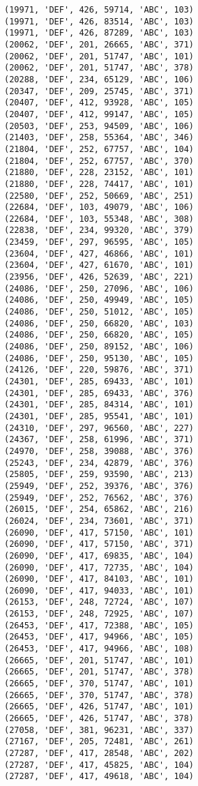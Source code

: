 \begin{verbatim}
(19971, 'DEF', 426, 59714, 'ABC', 103)
(19971, 'DEF', 426, 83514, 'ABC', 103)
(19971, 'DEF', 426, 87289, 'ABC', 103)
(20062, 'DEF', 201, 26665, 'ABC', 371)
(20062, 'DEF', 201, 51747, 'ABC', 101)
(20062, 'DEF', 201, 51747, 'ABC', 378)
(20288, 'DEF', 234, 65129, 'ABC', 106)
(20347, 'DEF', 209, 25745, 'ABC', 371)
(20407, 'DEF', 412, 93928, 'ABC', 105)
(20407, 'DEF', 412, 99147, 'ABC', 105)
(20503, 'DEF', 253, 94509, 'ABC', 106)
(21403, 'DEF', 258, 55364, 'ABC', 346)
(21804, 'DEF', 252, 67757, 'ABC', 104)
(21804, 'DEF', 252, 67757, 'ABC', 370)
(21880, 'DEF', 228, 23152, 'ABC', 101)
(21880, 'DEF', 228, 74417, 'ABC', 101)
(22580, 'DEF', 252, 50669, 'ABC', 251)
(22684, 'DEF', 103, 49079, 'ABC', 106)
(22684, 'DEF', 103, 55348, 'ABC', 308)
(22838, 'DEF', 234, 99320, 'ABC', 379)
(23459, 'DEF', 297, 96595, 'ABC', 105)
(23604, 'DEF', 427, 46866, 'ABC', 101)
(23604, 'DEF', 427, 61670, 'ABC', 101)
(23956, 'DEF', 426, 52639, 'ABC', 221)
(24086, 'DEF', 250, 27096, 'ABC', 106)
(24086, 'DEF', 250, 49949, 'ABC', 105)
(24086, 'DEF', 250, 51012, 'ABC', 105)
(24086, 'DEF', 250, 66820, 'ABC', 103)
(24086, 'DEF', 250, 66820, 'ABC', 105)
(24086, 'DEF', 250, 89152, 'ABC', 106)
(24086, 'DEF', 250, 95130, 'ABC', 105)
(24126, 'DEF', 220, 59876, 'ABC', 371)
(24301, 'DEF', 285, 69433, 'ABC', 101)
(24301, 'DEF', 285, 69433, 'ABC', 376)
(24301, 'DEF', 285, 84314, 'ABC', 101)
(24301, 'DEF', 285, 95541, 'ABC', 101)
(24310, 'DEF', 297, 96560, 'ABC', 227)
(24367, 'DEF', 258, 61996, 'ABC', 371)
(24970, 'DEF', 258, 39088, 'ABC', 376)
(25243, 'DEF', 234, 42879, 'ABC', 376)
(25805, 'DEF', 259, 93590, 'ABC', 213)
(25949, 'DEF', 252, 39376, 'ABC', 376)
(25949, 'DEF', 252, 76562, 'ABC', 376)
(26015, 'DEF', 254, 65862, 'ABC', 216)
(26024, 'DEF', 234, 73601, 'ABC', 371)
(26090, 'DEF', 417, 57150, 'ABC', 101)
(26090, 'DEF', 417, 57150, 'ABC', 371)
(26090, 'DEF', 417, 69835, 'ABC', 104)
(26090, 'DEF', 417, 72735, 'ABC', 104)
(26090, 'DEF', 417, 84103, 'ABC', 101)
(26090, 'DEF', 417, 94033, 'ABC', 101)
(26153, 'DEF', 248, 72724, 'ABC', 107)
(26153, 'DEF', 248, 72925, 'ABC', 107)
(26453, 'DEF', 417, 72388, 'ABC', 105)
(26453, 'DEF', 417, 94966, 'ABC', 105)
(26453, 'DEF', 417, 94966, 'ABC', 108)
(26665, 'DEF', 201, 51747, 'ABC', 101)
(26665, 'DEF', 201, 51747, 'ABC', 378)
(26665, 'DEF', 370, 51747, 'ABC', 101)
(26665, 'DEF', 370, 51747, 'ABC', 378)
(26665, 'DEF', 426, 51747, 'ABC', 101)
(26665, 'DEF', 426, 51747, 'ABC', 378)
(27058, 'DEF', 381, 96231, 'ABC', 337)
(27167, 'DEF', 205, 72481, 'ABC', 261)
(27287, 'DEF', 417, 28548, 'ABC', 202)
(27287, 'DEF', 417, 45825, 'ABC', 104)
(27287, 'DEF', 417, 49618, 'ABC', 104)

\end{verbatim}

